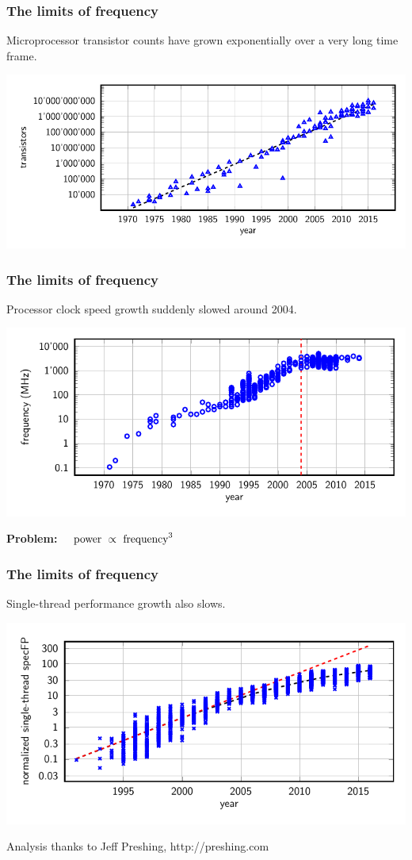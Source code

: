 \documentclass[aspectratio=43,12pt]{beamer}
\begin{document}
\begin{frame}
\frametitle{The limits of frequency}

\vfill
Microprocessor transistor counts have grown
exponentially over a very long time frame.

\vfill
\includegraphics[height=0.5\textheight]{transistors.pdf}

\vfill
\end{frame}

\begin{frame}
\frametitle{The limits of frequency}

\vfill
Processor clock speed growth suddenly slowed around 2004.

\vfill
\includegraphics[height=0.45\textwidth]{frequency.pdf}

\vfill
\centering
\textbf{Problem:} $\quad\hbox{power}\ \propto\ \hbox{frequency}^3$

\vfill
\end{frame}


\begin{frame}
\frametitle{The limits of frequency}
\vfill
Single-thread performance growth also slows.

\vfill
\includegraphics[height=0.5\textwidth]{fp-performance.pdf}

\vfill
\hfill{\scriptsize Analysis thanks to Jeff Preshing, http://preshing.com}
\end{frame}
\end{document}
